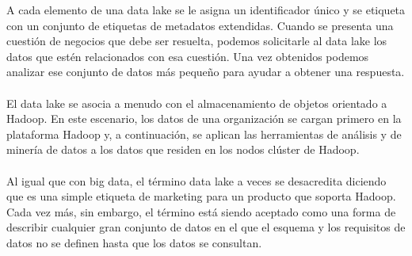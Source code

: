 \documentclass[11pt,a4paper]{article}
\begin{document}
		A cada elemento de una data lake se le asigna un identificador único y se etiqueta con un conjunto de etiquetas de metadatos extendidas. Cuando se presenta una cuestión de negocios que debe ser resuelta, podemos solicitarle al data lake los datos que estén relacionados con esa cuestión. Una vez obtenidos podemos analizar ese conjunto de datos más pequeño para ayudar a obtener una respuesta.\\
		\\
		El data lake se asocia a menudo con el almacenamiento de objetos orientado a Hadoop. En este escenario, los datos de una organización se cargan primero en la plataforma Hadoop y, a continuación, se aplican las herramientas de análisis y de minería de datos a los datos que residen en los nodos clúster de Hadoop.\\
		\\
		Al igual que con big data, el término data lake a veces se desacredita diciendo que es una simple etiqueta de marketing para un producto que soporta Hadoop. Cada vez más, sin embargo, el término está siendo aceptado como una forma de describir cualquier gran conjunto de datos en el que el esquema y los requisitos de datos no se definen hasta que los datos se consultan.\cite{DLake01:Online}
		
		\newpage

		
		
		
	
\end{document}
